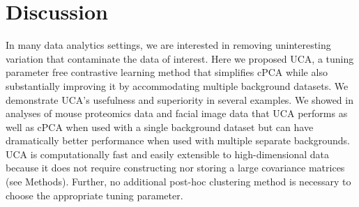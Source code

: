 \documentclass[10pt]{article}
\begin{document}
\section{Discussion}
In many data analytics settings, we are interested in removing uninteresting variation that contaminate the data of interest.
Here we proposed UCA, a tuning parameter free contrastive learning method that simplifies cPCA while also substantially improving it by accommodating multiple background datasets. We demonstrate UCA's usefulness and superiority in several examples. %
We showed in analyses of mouse proteomics data and facial image data that UCA performs as well as cPCA when used with a single background dataset but can have dramatically better performance when used with multiple separate backgrounds. %
UCA is computationally fast and easily extensible to high-dimensional data because it does not require constructing nor storing a large covariance matrices (see Methods). Further, no additional post-hoc clustering method is necessary to choose the appropriate tuning parameter.
\end{document}
